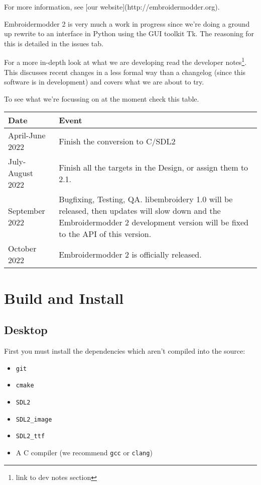 \documentclass[a4paper, 11pt]{report}
\begin{document}
For more information, see [our website](http://embroidermodder.org).

Embroidermodder 2 is very much a work in progress since we're doing a ground
up rewrite to an interface in Python using the GUI toolkit Tk.
The reasoning for this is detailed in the issues tab.

For a more in-depth look at what we are developing read
the developer notes\footnote{link to dev notes section}.
This discusses recent changes in a less formal way than a
changelog (since this software is in
development) and covers what we are about to try.

To see what we're focussing on at the moment check this table.

\begin{tabular}{l l}
\textbf{Date} & \textbf{Event} \\
\hline
April-June 2022 & Finish the conversion to C/SDL2 \\
July-August 2022 & Finish all the targets in the Design, or assign them to 2.1. \\
September 2022 & Bugfixing, Testing, QA. libembroidery 1.0 will be released, then updates will slow down and the Embroidermodder 2 development version will be fixed to the API of this version. \\
October 2022 & Embroidermodder 2 is officially released.
\end{tabular}

\section{Build and Install}

\subsection{Desktop}

First you must install the dependencies which aren't compiled into the source:

\begin{itemize}
\item \texttt{git}
\item \texttt{cmake}
\item \texttt{SDL2}
\item \texttt{SDL2\_image}
\item \texttt{SDL2\_ttf}
\item A C compiler (we recommend \texttt{gcc} or \texttt{clang})
\end{itemize}
\end{document}
